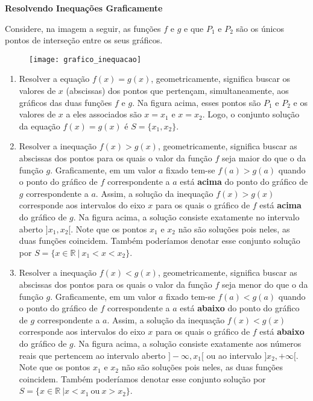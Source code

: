 \begin{observation}{}
\textbf{Resolvendo Inequações Graficamente}

Considere, na imagem a seguir, as funções $f$ e $g$ e que $P_1$ e $P_2$ são os únicos pontos de interseção entre os seus gráficos.

\begin{figure}[H]
\centering
\noindent\texttt{[image: grafico\_inequacao]}
\end{figure}


\begin{enumerate}
\item{}
	Resolver a equação $f(x) = g(x)$, geometricamente, significa buscar os valores de $x$ (abscissas) dos pontos que pertençam, simultaneamente, aos gráficos das duas funções $f$ e $g$. Na figura acima, esses pontos são $P_1$ e $P_2$ e os valores de $x$ a eles associados são $x = x_1$ e $x = x_2$. Logo, o conjunto solução da equação $f(x) = g(x)$ é $S =\{x_1, x_2\}$.

\item{}	
Resolver a inequação $f(x) > g(x)$, geometricamente, significa buscar as abscissas dos pontos para os quais o valor da função $f$ seja  maior do que o da função $g$. Graficamente, em um valor $a$ fixado tem-se $f(a)>g(a)$ quando o ponto do gráfico de $f$ correspondente a $a$ está \textbf{acima} do ponto do gráfico de $g$ correspondente a $a$. Assim, a solução da inequação $f(x)>g(x)$ corresponde aos intervalos do eixo $x$ para os quais o gráfico de $f$ está \textbf{acima} do gráfico de $g$. Na figura acima, a solução consiste exatamente no intervalo aberto $]x_1, x_2[$. Note que os pontos $x_1$ e $x_2$ não são soluções pois neles, as duas funções coincidem. Também poderíamos denotar esse conjunto solução por $S = \{x \in \mathbb{R}\ | \ x_1 < x < x_2\}$.

\item{}
Resolver a inequação $f(x) < g(x)$, geometricamente, significa buscar as abscissas dos pontos para os quais o valor da função $f$ seja menor do que o da função $g$. Graficamente, em um valor $a$ fixado tem-se $f(a)<g(a)$ quando o ponto do gráfico de $f$ correspondente a $a$ está \textbf{abaixo} do ponto do gráfico de $g$ correspondente a $a$. Assim, a solução da inequação $f(x)<g(x)$ corresponde aos intervalos do eixo $x$ para os quais o gráfico de $f$ está \textbf{abaixo} do gráfico de $g$. Na figura acima, a solução consiste exatamente aos números reais que pertencem ao intervalo aberto $]-\infty, x_1[$ ou ao intervalo $]x_2, +\infty[$. Note que os pontos $x_1$ e $x_2$ não são soluções pois neles, as duas funções coincidem. Também poderíamos denotar esse conjunto solução por $S = \{x \in \mathbb{R}\ | x < x_1 \ \mbox{ou} \ x > x_2\}$.


\end{enumerate}
\end{observation}
